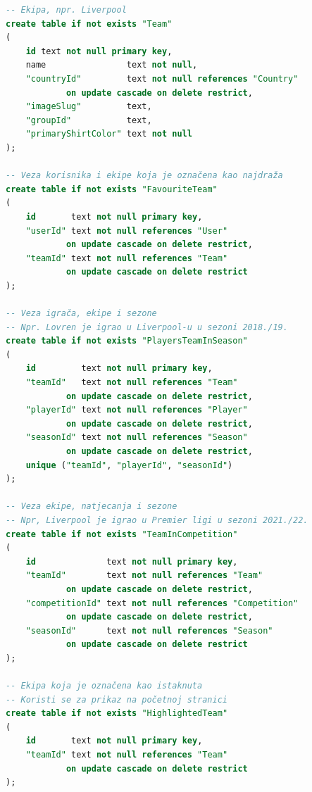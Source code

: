 \documentclass[times, utf8, zavrsni]{fer}
\begin{document}
\begin{lstlisting}[caption=Model baze podataka, language=SQL, numbers=none]
-- Ekipa, npr. Liverpool
create table if not exists "Team"
(
    id text not null primary key,
    name                text not null,
    "countryId"         text not null references "Country"
            on update cascade on delete restrict,
    "imageSlug"         text,
    "groupId"           text,
    "primaryShirtColor" text not null
);

-- Veza korisnika i ekipe koja je označena kao najdraža
create table if not exists "FavouriteTeam"
(
    id       text not null primary key,
    "userId" text not null references "User"
            on update cascade on delete restrict,
    "teamId" text not null references "Team"
            on update cascade on delete restrict
);

-- Veza igrača, ekipe i sezone
-- Npr. Lovren je igrao u Liverpool-u u sezoni 2018./19.
create table if not exists "PlayersTeamInSeason"
(
    id         text not null primary key,
    "teamId"   text not null references "Team"
            on update cascade on delete restrict,
    "playerId" text not null references "Player"
            on update cascade on delete restrict,
    "seasonId" text not null references "Season"
            on update cascade on delete restrict,
    unique ("teamId", "playerId", "seasonId")
);

-- Veza ekipe, natjecanja i sezone
-- Npr, Liverpool je igrao u Premier ligi u sezoni 2021./22.
create table if not exists "TeamInCompetition"
(
    id              text not null primary key,
    "teamId"        text not null references "Team"
            on update cascade on delete restrict,
    "competitionId" text not null references "Competition"
            on update cascade on delete restrict,
    "seasonId"      text not null references "Season"
            on update cascade on delete restrict
);

-- Ekipa koja je označena kao istaknuta
-- Koristi se za prikaz na početnoj stranici
create table if not exists "HighlightedTeam"
(
    id       text not null primary key,
    "teamId" text not null references "Team"
            on update cascade on delete restrict
);


\end{lstlisting}
\end{document}
